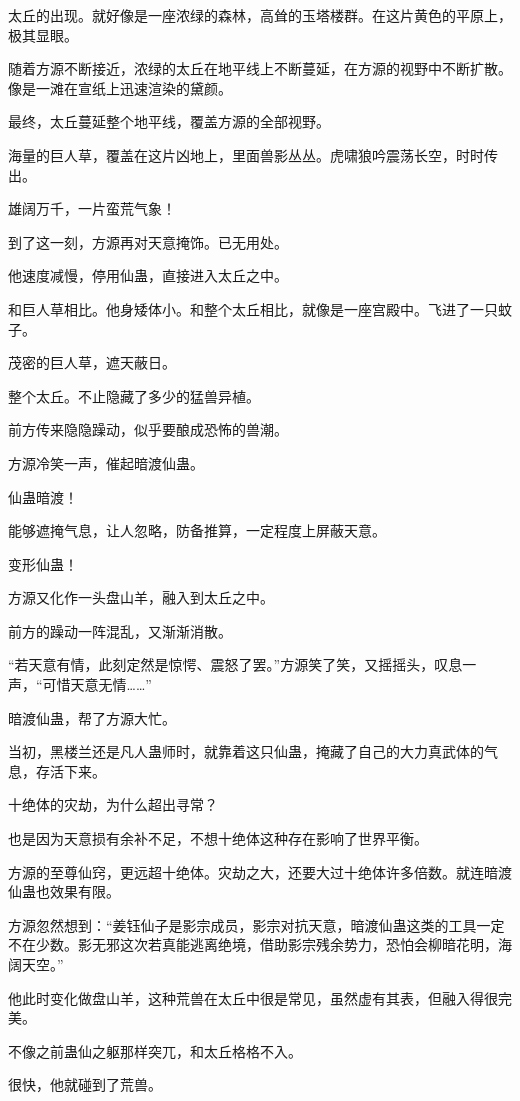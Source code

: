 \begin{this_body}
太丘的出现。就好像是一座浓绿的森林，高耸的玉塔楼群。在这片黄色的平原上，极其显眼。

随着方源不断接近，浓绿的太丘在地平线上不断蔓延，在方源的视野中不断扩散。像是一滩在宣纸上迅速渲染的黛颜。

最终，太丘蔓延整个地平线，覆盖方源的全部视野。

海量的巨人草，覆盖在这片凶地上，里面兽影丛丛。虎啸狼吟震荡长空，时时传出。

雄阔万千，一片蛮荒气象！

到了这一刻，方源再对天意掩饰。已无用处。

他速度减慢，停用仙蛊，直接进入太丘之中。

和巨人草相比。他身矮体小。和整个太丘相比，就像是一座宫殿中。飞进了一只蚊子。

茂密的巨人草，遮天蔽日。

整个太丘。不止隐藏了多少的猛兽异植。

前方传来隐隐躁动，似乎要酿成恐怖的兽潮。

方源冷笑一声，催起暗渡仙蛊。

仙蛊暗渡！

能够遮掩气息，让人忽略，防备推算，一定程度上屏蔽天意。

变形仙蛊！

方源又化作一头盘山羊，融入到太丘之中。

前方的躁动一阵混乱，又渐渐消散。

“若天意有情，此刻定然是惊愕、震怒了罢。”方源笑了笑，又摇摇头，叹息一声，“可惜天意无情……”

暗渡仙蛊，帮了方源大忙。

当初，黑楼兰还是凡人蛊师时，就靠着这只仙蛊，掩藏了自己的大力真武体的气息，存活下来。

十绝体的灾劫，为什么超出寻常？

也是因为天意损有余补不足，不想十绝体这种存在影响了世界平衡。

方源的至尊仙窍，更远超十绝体。灾劫之大，还要大过十绝体许多倍数。就连暗渡仙蛊也效果有限。

方源忽然想到：“姜钰仙子是影宗成员，影宗对抗天意，暗渡仙蛊这类的工具一定不在少数。影无邪这次若真能逃离绝境，借助影宗残余势力，恐怕会柳暗花明，海阔天空。”

他此时变化做盘山羊，这种荒兽在太丘中很是常见，虽然虚有其表，但融入得很完美。

不像之前蛊仙之躯那样突兀，和太丘格格不入。

很快，他就碰到了荒兽。


\end{this_body}
